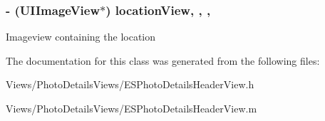 \subsubsection[{location\+View}]{\setlength{\rightskip}{0pt plus 5cm}-\/ (U\+I\+Image\+View$\ast$) location\+View\hspace{0.3cm}{\ttfamily [read]}, {\ttfamily [write]}, {\ttfamily [nonatomic]}, {\ttfamily [strong]}}\label{interface_e_s_photo_details_header_view_af478dcf2fa013a647a29a506c48d01e1}
Imageview containing the location 

The documentation for this class was generated from the following files\+:\begin{DoxyCompactItemize}
\item 
Views/\+Photo\+Details\+Views/E\+S\+Photo\+Details\+Header\+View.\+h\item 
Views/\+Photo\+Details\+Views/E\+S\+Photo\+Details\+Header\+View.\+m\end{DoxyCompactItemize}
